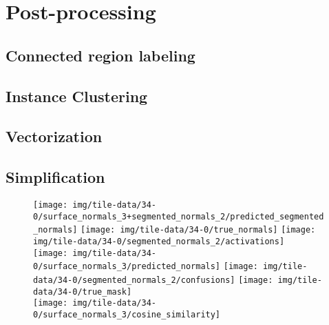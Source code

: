 \chapter{Post-processing}%
\label{chap:post-processing}



\section{Connected region labeling}%
\label{sec:connected-region-labeling}


\section{Instance Clustering}%
\label{sec:instance-clustering}


\section{Vectorization}%
\label{sec:vectorization}


\section{Simplification}%
\label{sec:simplification}


\begin{figure}
  \centering
  \texttt{[image: img/tile-data/34-0/surface\_normals\_3+segmented\_normals\_2/predicted\_segmented\_normals]}
  \texttt{[image: img/tile-data/34-0/true\_normals]}
  \texttt{[image: img/tile-data/34-0/segmented\_normals\_2/activations]}
  \\
  \texttt{[image: img/tile-data/34-0/surface\_normals\_3/predicted\_normals]}
  \texttt{[image: img/tile-data/34-0/segmented\_normals\_2/confusions]}
  \texttt{[image: img/tile-data/34-0/true\_mask]}
  \\
  \hspace{2.15em}\texttt{[image: img/tile-data/34-0/surface\_normals\_3/cosine\_similarity]}
\end{figure}
